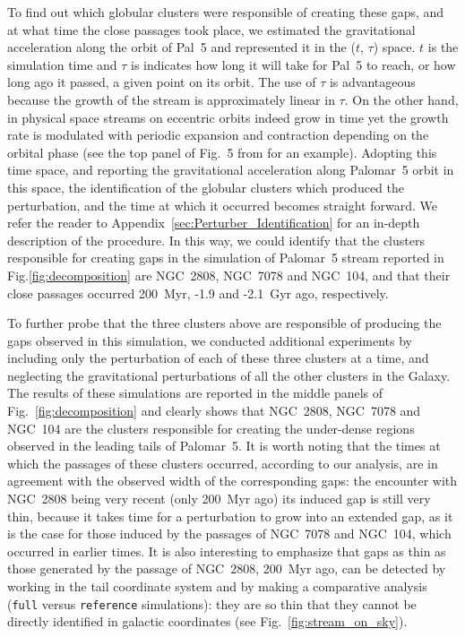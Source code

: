 \documentclass{aa}
\begin{document}
    To find out which globular clusters were responsible of creating these gaps, and at what time the close passages took place, we estimated the gravitational acceleration along the orbit of Pal~5 and represented it in the ($t$, $\tau$) space. $t$ is the simulation time and $\tau$ is indicates how long it will take for Pal~5 to reach, or how  long ago it passed, a given point on its orbit. The use of $\tau$ is advantageous because the growth of the stream is approximately linear in $\tau$. On the other hand, in physical space streams on eccentric orbits indeed grow in time yet the growth rate is modulated with periodic expansion and contraction depending on the orbital phase (see the top panel of Fig.~5 from \citet{2016MNRAS.457.3817S} for an example). Adopting this time space, and reporting the gravitational acceleration along Palomar~5 orbit in this space, the identification of the globular clusters which produced the perturbation, and the time at which it occurred becomes straight forward. We refer the reader to Appendix~\ref{sec:Perturber_Identification} for an in-depth description of the procedure. In this way, we could identify that the clusters responsible for creating gaps in the simulation of Palomar~5 stream reported in Fig.\ref{fig:decomposition} are NGC~2808, NGC~7078 and NGC~104, and that their close passages occurred 200~Myr, -1.9 and -2.1~Gyr ago, respectively. 
    
    To further probe that the three clusters above are responsible of producing the gaps observed in this simulation, we conducted additional experiments by including only the perturbation of each of these three clusters at a time, and neglecting the gravitational perturbations of all the other clusters in the Galaxy. The results of these simulations are reported in the middle panels of Fig.~\ref{fig:decomposition} and clearly shows that NGC~2808, NGC~7078 and NGC~104 are the clusters responsible for creating the under-dense regions observed in the leading tails of Palomar~5. It is worth noting that the times at which the passages of these clusters occurred, according to our analysis, are in agreement with the observed width of the corresponding gaps: the encounter with NGC~2808 being very recent (only 200~Myr ago) its induced gap is still very thin, because it takes time for a perturbation to grow into an extended gap, as it is the case for those induced by the passages of  NGC~7078 and NGC~104, which occurred in earlier times. It is also interesting to emphasize that gaps as thin as those generated by the passage of NGC~2808, 200~Myr ago, can be detected by working in the tail coordinate system and by making a comparative analysis (\texttt{full} versus \texttt{reference} simulations): they are so thin that they cannot be directly identified in galactic coordinates (see Fig.~\ref{fig:stream_on_sky}).\\
\end{document}
